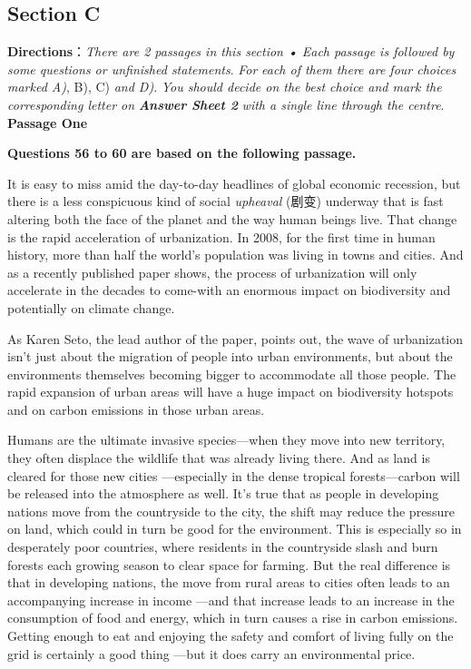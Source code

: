 \documentclass[UTF8,11pt]{ctexart}
\begin{document}
\subsection*{\textbf{Section C}}


\textbf{Directions}：\textit{There are 2 passages in this section • Each passage is followed by some questions or unfinished statements}.\textit{ For} \textit{each of them there are four choices marked A)}, B), C)\textit{ and D)}.\textit{ You should decide on the best choice and mark the} \textit{corresponding letter on}\textbf{\textit{ Answer Sheet 2}}\textit{ with a single line through the centre}.\textbf{ Passage One}


\textbf{Questions 56 to 60 are based on the following passage.}


It is easy to miss amid the day-to-day headlines of global economic recession, but there is a less conspicuous kind of social \textit{upheaval} (剧变) underway that is fast altering both the face of the planet and the way human beings live. That change is the rapid acceleration of urbanization. In 2008, for the first time in human history, more than half the world’s population was living in towns and cities. And as a recently published paper shows, the process of urbanization will only accelerate in the decades to come-with an enormous impact on biodiversity and potentially on climate change.


As Karen Seto, the lead author of the paper, points out, the wave of urbanization isn’t just about the migration of people into urban environments, but about the environments themselves becoming bigger to accommodate all those people. The rapid expansion of urban areas will have a huge impact on biodiversity hotspots and on carbon emissions in those urban areas.


Humans are the ultimate invasive species—when they move into new territory, they often displace the wildlife that was already living there. And as land is cleared for those new cities —especially in the dense tropical forests—carbon will be released into the atmosphere as well. It’s true that as people in developing nations move from the countryside to the city, the shift may reduce the pressure on land, which could in turn be good for the environment. This is especially so in desperately poor countries, where residents in the countryside slash and burn forests each growing season to clear space for farming. But the real difference is that in developing nations, the move from rural areas to cities often leads to an accompanying increase in income —and that increase leads to an increase in the consumption of food and energy, which in turn causes a rise in carbon emissions. Getting enough to eat and enjoying the safety and comfort of living fully on the grid is certainly a good thing —but it does carry an environmental price.
\end{document}
